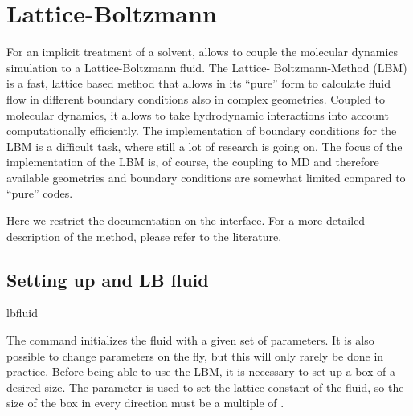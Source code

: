%  
%   
%  
%  
%

\chapter{Lattice-Boltzmann}
\label{sec:lb}

For an implicit treatment of a solvent, \es allows to couple the
molecular dynamics simulation to a Lattice-Boltzmann fluid. The Lattice-
Boltzmann-Method (LBM) is a fast, lattice based method that allows in its
``pure'' form to calculate fluid flow in different boundary conditions
also in complex geometries. Coupled to molecular dynamics, it allows
to take hydrodynamic interactions into account
computationally efficiently. The implementation of boundary conditions
for the LBM is a difficult task, where still a lot of research is going 
on. The focus of the \es implementation of the LBM is, of course, the
coupling to MD and therefore available geometries and boundary
conditions are somewhat limited compared to ``pure'' codes. 


Here we restrict the documentation on the interface. For a more detailed
description of the method, please refer to the literature.

\section{Setting up and LB fluid}
\begin{essyntax}
  lbfluid
  \begin{features}
  \end{features}
\end{essyntax}
The  command initializes the fluid with a given
set of parameters. It is also possible to change parameters on the
fly, but this will only rarely be done in practice. Before being able
to use the LBM, it is necessary to set up a box of a desired size. The
parameter  is used to set the lattice constant of the
fluid, so the size of the box in every direction must be a multiple of
.

